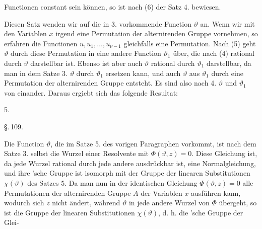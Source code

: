 Functionen constant sein können, so ist nach (6) der Satz 4.
bewiesen.

Diesen Satz wenden wir auf die in 3. vorkommende Function
 $\vartheta$ an. Wenn wir mit den Variablen $x$ irgend eine Permutation
 der alternirenden Gruppe vornehmen, so erfahren die
Functionen $u, u_1, \ldots, u_{\nu-1}$ gleichfalls eine Permutation. Nach
(5) geht $\vartheta$ durch diese Permutation in eine andere Function $\vartheta_1$
über, die nach (4) rational durch $\vartheta$ darstellbar ist. Ebenso ist
aber auch $\vartheta$ rational durch $\vartheta_1$ darstellbar, da man in dem
Satze 3. $\vartheta$ durch $\vartheta_1$ ersetzen kann, und auch $\vartheta$ aus $\vartheta_1$ durch
eine Permutation der alternirenden Gruppe entsteht. Es sind
also nach 4. $\vartheta$ und $\vartheta_1$  von einander.
Daraus ergiebt sich das folgende Resultat:

5.~

\begin{center}
\S.\,109.

\end{center}

Die Function $\vartheta$, die im Satze 5. des vorigen Paragraphen
vorkommt, ist nach dem Satze 3. selbst die Wurzel einer Resolvente
 mit  $\Phi(\vartheta, z) = 0$. Diese Gleichung
ist, da jede Wurzel rational durch jede andere ausdrückbar ist,
eine Normalgleichung, und ihre 'sche Gruppe ist isomorph
 mit der Gruppe der linearen Substitutionen $\chi(\vartheta)$ des
Satzes 5. Da man nun in der identischen Gleichung $\Phi(\vartheta, z) = 0$
alle Permutationen der alternirenden Gruppe $A$ der Variablen $x$
ausführen kann, wodurch sich $z$ nicht ändert, während $\vartheta$ in jede
andere Wurzel von $\Phi$ übergeht, so ist die Gruppe der linearen
Substitutionen $\chi(\vartheta)$, d. h. die 'sche Gruppe der Glei-
